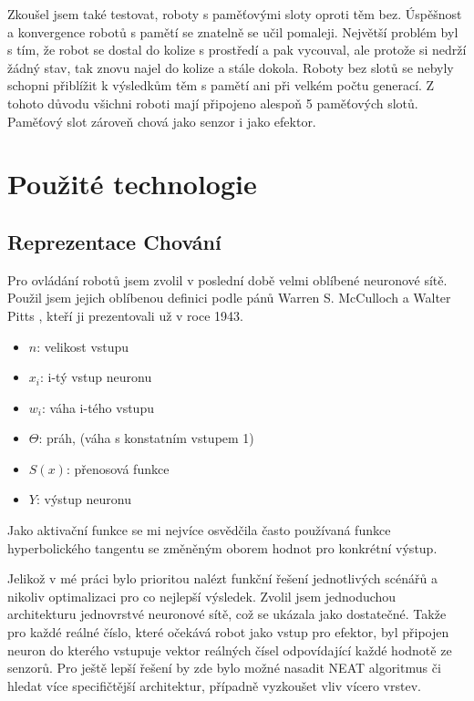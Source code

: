 Zkoušel jsem také testovat, roboty s paměťovými sloty oproti těm bez. Úspěšnost a konvergence robotů s pamětí se znatelně se učil pomaleji. Největší problém byl s tím, že robot se dostal do kolize s prostředí a pak vycouval, ale protože si nedrží žádný stav, tak znovu najel do kolize a stále dokola. Roboty bez slotů se nebyly schopni přiblížit k výsledkům těm s pamětí ani při velkém počtu generací. Z tohoto důvodu všichni roboti mají připojeno alespoň 5 paměťových slotů. Paměťový slot zároveň chová jako senzor i jako efektor. 

\section{Použité technologie}
\subsection{Reprezentace Chování}
Pro ovládání robotů jsem zvolil v poslední době velmi oblíbené neuronové sítě. Použil jsem jejich oblíbenou definici podle pánů Warren S. McCulloch a  Walter Pitts \citep{neuron}, kteří ji prezentovali už v roce 1943. 
\begin{itemize}[]
	\item $n$: velikost vstupu
	\item $x_i$:  i-tý vstup neuronu
	\item $w_i$:  váha i-tého vstupu
	\item $\Theta$: práh, (váha s konstatním vstupem 1)
	\item $S(x)$: přenosová funkce
	\item $Y$: výstup neuronu 
\end{itemize}

\begin{center}
	\large{}
\end{center}
Jako aktivační funkce se mi nejvíce osvědčila často používaná funkce hyperbolického tangentu se změněným oborem hodnot pro konkrétní výstup. \par
{}Jelikož v mé práci bylo prioritou nalézt funkční řešení jednotlivých scénářů a nikoliv optimalizaci pro co nejlepší výsledek.  Zvolil jsem jednoduchou architekturu jednovrstvé neuronové sítě, což se ukázala jako dostatečné. Takže pro každé reálné číslo, které očekává robot jako vstup pro efektor, byl připojen neuron do kterého vstupuje vektor reálných čísel odpovídající každé hodnotě ze senzorů.  Pro ještě lepší řešení by zde bylo možné nasadit NEAT algoritmus či hledat více specifičtější architektur, případně vyzkoušet vliv vícero vrstev. 
